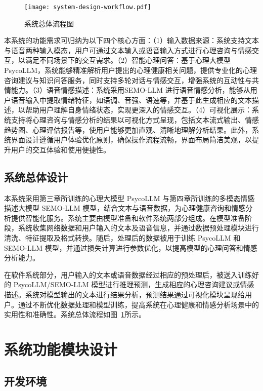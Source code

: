 \begin{figure}[ht]
  \centering
  \texttt{[image: system-design-workflow.pdf]}
  \caption{系统总体流程图}
  \label{fig:system-design-workflow}
\end{figure}

本系统的功能需求可归纳为以下四个核心方面：（1）输入数据来源：系统支持文本与语音两种输入模态，用户可通过文本输入或语音输入方式进行心理咨询与情感交互，以满足不同场景下的交互需求。（2）智能心理问答：基于心理大模型 PsycoLLM，系统能够精准解析用户提出的心理健康相关问题，提供专业化的心理咨询建议与知识问答服务，同时支持多轮对话与情感交互，增强系统的互动性与共情能力。（3）语音情感描述：系统采用SEMO-LLM 进行语音情感分析，能够从用户语音输入中提取情绪特征，如语调、音强、语速等，并基于此生成相应的文本描述，以帮助用户理解自身情绪状态，实现更深入的情感交互。（4）可视化展示：系统支持将心理咨询与情感分析的结果以可视化方式呈现，包括文本流式输出、情感趋势图、心理评估报告等，使用户能够更加直观、清晰地理解分析结果。此外，系统界面设计遵循用户体验优化原则，确保操作流程流畅，界面布局简洁美观，以提升用户的交互体验和使用便捷性。

\subsection{系统总体设计}

本系统采用第三章所训练的心理大模型 PsycoLLM 与第四章所训练的多模态情感描述大模型 SEMO-LLM 模型，结合文本与语音数据，为心理健康咨询和情感分析提供智能化服务。系统主要由模型准备和软件系统两部分组成。在模型准备阶段，系统收集网络数据和用户输入的文本及语音信息，并通过数据预处理模块进行清洗、特征提取及格式转换。随后，处理后的数据被用于训练 PsycoLLM 和 SEMO-LLM 模型，并通过损失计算进行参数优化，以提高模型的心理问答和情感分析能力。

在软件系统部分，用户输入的文本或语音数据经过相应的预处理后，被送入训练好的 PsycoLLM/SEMO-LLM 模型进行推理预测，生成相应的心理咨询建议或情感描述。系统对模型输出的文本进行结果分析，预测结果通过可视化模块呈现给用户。通过不断优化数据处理和模型训练，提高系统在心理健康和情感分析场景中的实用性和准确性。系统总体流程如图~\ref{fig:system-design-workflow}所示。

\section{系统功能模块设计}

\subsection{开发环境}

